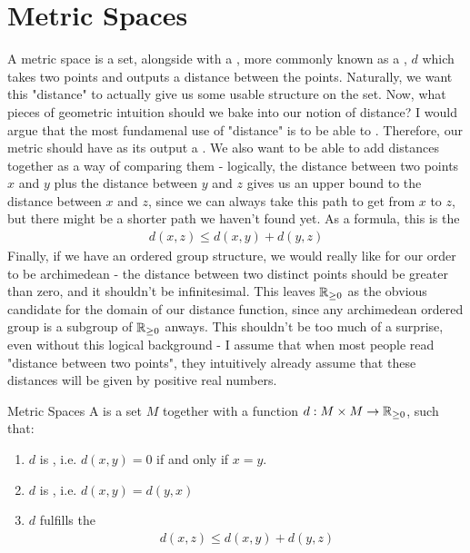 \section{Metric Spaces}
A metric space is a set, alongside with a , more commonly known as a , $d$ which takes two points and outputs a distance between the points. Naturally, we want this "distance" to actually give us some usable structure on the set.
\newpar
Now, what pieces of geometric intuition should we bake into our notion of distance? I would argue that the most fundamenal use of "distance" is to be able to . Therefore, our metric should have as its output a .
\newpar
We also want to be able to add distances together as a way of comparing them - logically, the distance between two points $x$ and $y$ plus the distance between $y$ and $z$ gives us an upper bound to the distance between $x$ and $z$, since we can always take this path to get from $x$ to $z$, but there might be a shorter path we haven't found yet. As a formula, this is the 
\begin{align*}
	d(x,z) \leq d(x,y) + d(y,z)
\end{align*}
Finally, if we have an ordered group structure, we would really like for our order to be archimedean - the distance between two distinct points should be greater than zero, and it shouldn't be infinitesimal. 
\newpar
This leaves $\mathbb{R}_{\geq 0}$ as the obvious candidate for the domain of our distance function, since any archimedean ordered group is a subgroup of $\mathbb{R}_{\geq 0}$ anways. This shouldn't be too much of a surprise, even without this logical background - I assume that when most people read "distance between two points", they intuitively already assume that these distances will be given by positive real numbers.
\begin{importantdefinition}{Metric Spaces}{}
	A  is a set $M$ together with a function $d : M \times M \to \mathbb{R}_{\geq{0}}$, such that:
	\begin{enumerate}
		\item $d$ is , i.e. $d(x,y) = 0$ if and only if $x = y$.
		\item $d$ is , i.e. $d(x,y) = d(y,x)$
		\item $d$ fulfills the 
		\begin{align*}
			d(x,z) \leq d(x,y) + d(y,z)
		\end{align*}
	\end{enumerate}
\end{importantdefinition}

